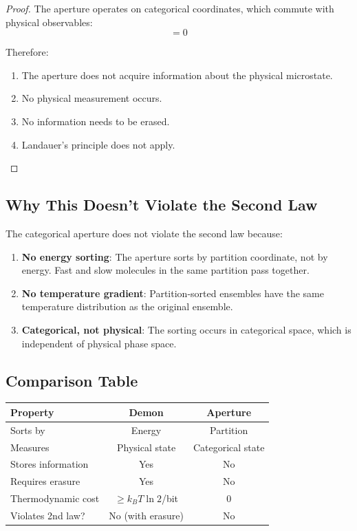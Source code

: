 \documentclass[twocolumn,10pt]{article}
\begin{document}
\begin{proof}
The aperture operates on categorical coordinates, which commute with physical observables:
\begin{equation}
    [\hat{O}_{\text{cat}}, \hat{O}_{\text{phys}}] = 0
\end{equation}

Therefore:
\begin{enumerate}
    \item The aperture does not acquire information about the physical microstate.
    \item No physical measurement occurs.
    \item No information needs to be erased.
    \item Landauer's principle does not apply.
\end{enumerate}
\end{proof}

\subsection{Why This Doesn't Violate the Second Law}

The categorical aperture does not violate the second law because:

\begin{enumerate}
    \item \textbf{No energy sorting}: The aperture sorts by partition coordinate, not by energy. Fast and slow molecules in the same partition pass together.

    \item \textbf{No temperature gradient}: Partition-sorted ensembles have the same temperature distribution as the original ensemble.

    \item \textbf{Categorical, not physical}: The sorting occurs in categorical space, which is independent of physical phase space.
\end{enumerate}

\subsection{Comparison Table}

\begin{center}
\begin{tabular}{lcc}
\toprule
Property & Demon & Aperture \\
\midrule
Sorts by & Energy & Partition \\
Measures & Physical state & Categorical state \\
Stores information & Yes & No \\
Requires erasure & Yes & No \\
Thermodynamic cost & $\geq k_B T \ln 2$/bit & 0 \\
Violates 2nd law? & No (with erasure) & No \\
\bottomrule
\end{tabular}
\end{center}
\end{document}
